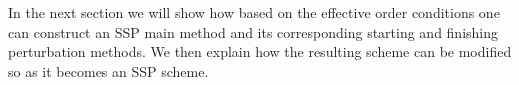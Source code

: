 %
%
%

In the next section we will show how based on the effective order conditions one can construct an SSP main method and its corresponding starting and finishing perturbation methods. We then explain how the resulting scheme can be modified so as it becomes an SSP scheme. 